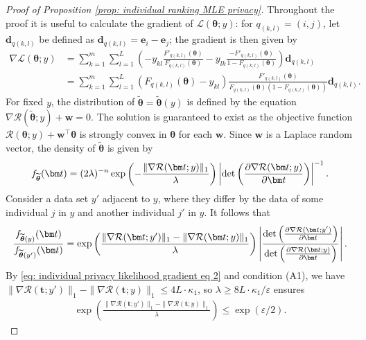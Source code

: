 \documentclass[letterpaper,12pt]{article}
\numberwithin{equation}{section}
\theoremstyle{plain}
\numberwithin{Theorem}{section}
\numberwithin{corollary}{section}
\numberwithin{proposition}{section}
\numberwithin{Lemma}{section}
{
	\theoremstyle{definition}
	\newtheorem{Definition}{Definition}
	\newtheorem{example}{Example}
	\numberwithin{example}{section}
	\newtheorem{fact}{Fact}
	\numberwithin{fact}{section}
	\newtheorem{remark}{Remark}
}
\newcommand{\1}{\mathbbm{1}}
\def\bth{{\boldsymbol{\theta}}}
\def\det{{\rm det}}
\begin{document}
\begin{proof}[Proof of Proposition \ref{prop: individual ranking MLE privacy}]
	
	Throughout the proof it is useful to calculate the gradient of $\mathcal L(\bth; y)$: for $q_{(k, l)} = (i, j)$, let $\bm d_{q(k, l)}$ be defined as $\bm d_{q(k, l)} = \bm e_i - \bm e_j$; the gradient is then given by 
	\begin{align}
		\nabla\mathcal L(\bth; y) &= \sum_{k=1}^m \sum_{l = 1}^L  \left( -y_{kl}\frac{F'_{q(k, l)}(\bth)}{F_{q(k, l)}(\bth)} -y_{lk}\frac{-F'_{q(k, l)}(\bth)}{1 - F_{q(k, l)}(\bth)}\right) \bm d_{q(k, l)} \label{eq: individual privacy likelihood gradient eq 1}\\
		&= \sum_{k=1}^m \sum_{l = 1}^L  (F_{q(k, l)}(\bth) - y_{kl})\frac{F'_{q(k, l)}(\bth)}{F_{q(k, l)}(\bth)(1 - F_{q(k, l)}(\bth))}\bm d_{q(k, l)}. \label{eq: individual privacy likelihood gradient eq 2}
	\end{align} 
	For fixed $y$, the distribution of $\widetilde\bth = \widetilde\bth(y)$ is defined by the equation $\nabla \mathcal R(\widetilde\bth; y) + \bm w = 0$. The solution is guaranteed to exist as the objective function $\mathcal R(\bth; y) + \bm w^\top \bth$ is strongly convex in $\bth$ for each $\bm w$.  Since $\bm w$ is a Laplace random vector, the density of $\widetilde\bth$ is given by
	\begin{align*}
		f_{\widetilde\bth}(\bm t) = (2\lambda)^{-n}\exp\left(-\frac{\|\nabla \mathcal R(\bm t; y)\|_1}{\lambda}\right) \left|\det \left(\frac{\partial \nabla \mathcal R(\bm t; y)}{\partial\bm t}\right)\right|^{-1}. 
	\end{align*}
	Consider a data set $y'$ adjacent to $y$, where they differ by the data of some individual $j$ in $y$ and another individual $j'$ in $y$. It follows that
	\begin{align*}
		\frac{f_{\widetilde\bth(y)}(\bm t)}{f_{\widetilde\bth(y')}(\bm t)} = \exp\left(\frac{\|\nabla \mathcal R(\bm t; y')\|_1 - \|\nabla \mathcal R(\bm t; y)\|_1 }{\lambda}\right) \left|\frac{\det \left(\frac{\partial \nabla \mathcal R(\bm t; y')}{\partial\bm t}\right)}{\det \left(\frac{\partial \nabla \mathcal R(\bm t; y)}{\partial\bm t}\right)}\right|.
	\end{align*}
	By \eqref{eq: individual privacy likelihood gradient eq 2} and condition (A1), we have $\|\nabla \mathcal R(\bm t; y')\|_1 - \|\nabla \mathcal R(\bm t; y)\|_1 \leq 4L \cdot \kappa_1$, so $\lambda \geq 8L \cdot \kappa_1/\varepsilon$ ensures 
	\begin{align*}
		\exp\left(\frac{\|\nabla \mathcal R(\bm t; y')\|_1 - \|\nabla \mathcal R(\bm t; y)\|_1 }{\lambda}\right) \leq \exp(\varepsilon/2).
	\end{align*}

\end{proof}
\end{document}
